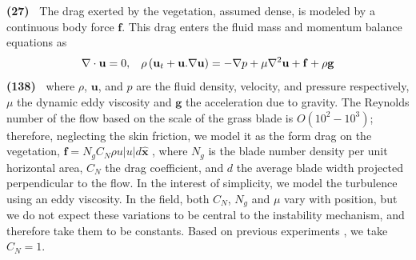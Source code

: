 \documentclass[aps,prl,reprint,twocolumn,superscriptaddress,sort&compress,10pt]{revtex4-1}  %
\newcommand{\bx}{{\boldsymbol{\hat{x}}}}
\newcommand{\bu}{\mathbf{u}}
\newcommand{\grad}{\mathbf{\nabla}}
\newcommand{\words}[1]{\textbf{(#1)~}}
\begin{document}
\words{27} The drag exerted by the vegetation, assumed dense, is modeled by a continuous body force $\mathbf{f}$.
This drag enters the fluid mass and momentum balance equations as 
\begin{equation}
\grad\cdot\bu = 0,\hspace{3mm} \rho \left(\bu_{t}+\bu.\grad\bu \right) = -\grad p+\mu\grad^{2}\bu +\mathbf{f}+\rho\mathbf{g}
\label{navier-stokes}
\end{equation}
\words{138} where $\rho$, $\bu$, and $p$ are the fluid density, velocity, and pressure respectively, $\mu$ the dynamic eddy viscosity and $\mathbf{g}$ the acceleration due to gravity. 
The Reynolds number of the flow based on the scale of the grass blade is $O(10^2-10^3)$; therefore, neglecting the skin friction, we model it as the form drag on the vegetation, $\mathbf{f}=N_g C_N \rho u |u| d\bx$ \cite{Nepf99,Nepf00,Nepf04}, where  $N_g$ is the blade number density per unit horizontal area, $C_{N}$ the drag coefficient, and $d$ the average blade width projected perpendicular to the flow. 
In the interest of simplicity, we model the turbulence using an eddy viscosity. 
In the field, both $C_N$, $N_g$ and $\mu$ vary with position, but we do not expect these variations to be central to the instability mechanism, and therefore take them to be constants. 
Based on previous experiments \cite{Vivoni98,Nepf00}, we take $C_N = 1$.
\end{document}
